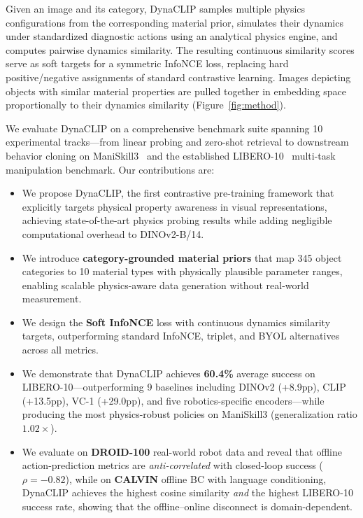 \documentclass{article}
\newcommand{\methodname}{DynaCLIP}
\newcommand{\best}[1]{\textbf{#1}}
\begin{document}
Given an image and its category, \methodname{} samples multiple physics configurations from the corresponding material prior, simulates their dynamics under standardized diagnostic actions using an analytical physics engine, and computes pairwise dynamics similarity. The resulting continuous similarity scores serve as soft targets for a symmetric InfoNCE loss, replacing hard positive/negative assignments of standard contrastive learning. Images depicting objects with similar material properties are pulled together in embedding space proportionally to their dynamics similarity (Figure~\ref{fig:method}).

We evaluate \methodname{} on a comprehensive benchmark suite spanning 10 experimental tracks---from linear probing and zero-shot retrieval to downstream behavior cloning on ManiSkill3~\cite{gu2024maniskill3} and the established LIBERO-10~\cite{liu2024libero} multi-task manipulation benchmark. Our contributions are:

\begin{itemize}[leftmargin=*,itemsep=1pt,topsep=2pt]
    \item We propose \methodname{}, the first contrastive pre-training framework that explicitly targets physical property awareness in visual representations, achieving state-of-the-art physics probing results while adding negligible computational overhead to DINOv2-B/14.
    \item We introduce \textbf{category-grounded material priors} that map 345 object categories to 10 material types with physically plausible parameter ranges, enabling scalable physics-aware data generation without real-world measurement.
    \item We design the \textbf{Soft InfoNCE} loss with continuous dynamics similarity targets, outperforming standard InfoNCE, triplet, and BYOL alternatives across all metrics.
    \item We demonstrate that \methodname{} achieves \best{60.4\%} average success on LIBERO-10---outperforming 9 baselines including DINOv2 (+8.9pp), CLIP (+13.5pp), VC-1 (+29.0pp), and five robotics-specific encoders---while producing the most physics-robust policies on ManiSkill3 (generalization ratio $1.02\times$).
    \item We evaluate on \textbf{DROID-100} real-world robot data and reveal that offline action-prediction metrics are \emph{anti-correlated} with closed-loop success ($\rho{=}-0.82$), while on \textbf{CALVIN} offline BC with language conditioning, \methodname{} achieves the highest cosine similarity \emph{and} the highest LIBERO-10 success rate, showing that the offline--online disconnect is domain-dependent.
\end{itemize}
\end{document}
